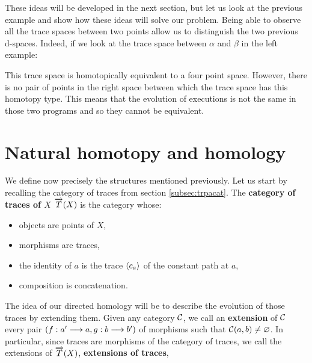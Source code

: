 These ideas will be developed in the next section, but let us look at the previous example and show how these ideas will solve our problem. Being able to observe all the trace spaces between two points allow us to distinguish the two previous d-spaces. Indeed, if we look at the trace space between $\alpha$ and $\beta$ in the left example:
	\begin{figure}[H]
		\begin{center}
    			
  		\end{center}
	\end{figure}
This trace space is homotopically equivalent to a four point space. However, there is no pair of points in the right space between which the trace space has this homotopy type. This means that the evolution of executions is not the same in those two programs and so they cannot be equivalent.


\section{Natural homotopy and homology}
\label{sec:nathom}

We define now precisely the structures mentioned previously. Let us start by recalling the category of traces from section \ref{subsec:trpacat}. The \textbf{category of traces of $X$} $\overrightarrow{T}(X)$ is the category whose:
 \begin{itemize}
 	\item objects are points of $X$,
	\item morphisms are traces,
	\item the identity of $a$ is the trace $\langle c_a\rangle$ of the constant path at $a$,
	\item composition is concatenation.
\end{itemize}

The idea of our directed homology will be to describe the evolution of those traces by extending them. Given any category $\mathcal{C}$, we call an \textbf{extension} of $\mathcal{C}$ every pair $(f : a' \longrightarrow a,g : b \longrightarrow b')$ of morphisms such that $\mathcal{C}(a,b) \neq \varnothing$. In particular, since traces are morphisms of the category of traces, we call the extensions of $\overrightarrow{T}(X)$, \textbf{extensions of traces},


